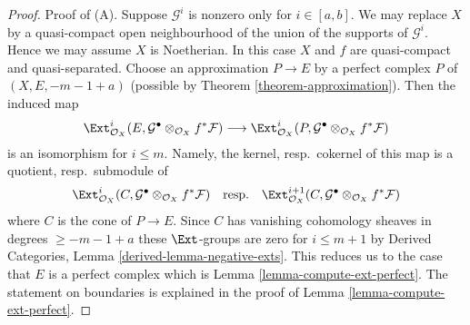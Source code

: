 \begin{proof}
Proof of (A).
Suppose $\mathcal{G}^i$ is nonzero only for $i \in [a, b]$.
We may replace $X$ by a quasi-compact open neighbourhood of
the union of the supports of $\mathcal{G}^i$.
Hence we may assume $X$ is Noetherian.
In this case $X$ and $f$ are quasi-compact and quasi-separated.
Choose an approximation $P \to E$ by a perfect complex $P$ of
$(X, E, -m - 1 + a)$
(possible by Theorem \ref{theorem-approximation}).
Then the induced map
$$
\Ext^i_{\mathcal{O}_X}(E,
\mathcal{G}^\bullet \otimes_{\mathcal{O}_X} f^*\mathcal{F})
\longrightarrow
\Ext^i_{\mathcal{O}_X}(P,
\mathcal{G}^\bullet \otimes_{\mathcal{O}_X} f^*\mathcal{F})
$$
is an isomorphism for $i \leq m$. Namely, the kernel, resp.\ cokernel of this
map is a quotient, resp.\ submodule of
$$
\Ext^i_{\mathcal{O}_X}(C,
\mathcal{G}^\bullet \otimes_{\mathcal{O}_X} f^*\mathcal{F})
\quad\text{resp.}\quad
\Ext^{i + 1}_{\mathcal{O}_X}(C,
\mathcal{G}^\bullet \otimes_{\mathcal{O}_X} f^*\mathcal{F})
$$
where $C$ is the cone of $P \to E$. Since $C$ has vanishing cohomology
sheaves in degrees $\geq -m - 1 + a$ these $\Ext$-groups are zero
for $i \leq m + 1$ by
Derived Categories, Lemma \ref{derived-lemma-negative-exts}.
This reduces us to the case that
$E$ is a perfect complex which is Lemma \ref{lemma-compute-ext-perfect}.
The statement on boundaries is explained in the proof of
Lemma \ref{lemma-compute-ext-perfect}.


\end{proof}
